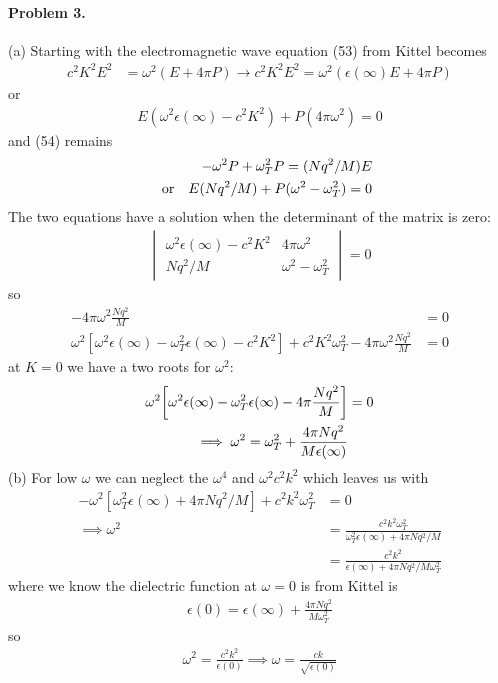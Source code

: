\documentclass[../main.tex]{subfiles}
\begin{document}
\paragraph*{Problem 3.} (a) Starting with the electromagnetic wave equation (53) from Kittel becomes
\begin{align*}
    c^2 K^2 E^2 &= \omega^2 (E + 4\pi P) \to c^2 K^2 E^2 = \omega^2(\epsilon(\infty)E + 4\pi P)
\end{align*}
or
\begin{align*}
    E(\omega^2 \epsilon(\infty) - c^2 K^2) + P(4\pi \omega^2) = 0
\end{align*}
and (54) remains 
\begin{align*}
    - \omega^2 P + \omega_T^2 P = (Nq^2/M) E \\
    \qor 
    E(Nq^2/M) + P(\omega^2 - \omega_T^2) = 0
\end{align*}
The two equations have a solution when the determinant of the matrix is zero:
\begin{align*}
    \begin{vmatrix}
        \omega^2 \epsilon(\infty) - c^2 K^2 & 4\pi\omega^2 \\
        Nq^2/M & \omega^2 - \omega_T^2
    \end{vmatrix} = 0
\end{align*}
so 
\begin{align*}
    [\omega^2 \epsilon(\infty) - c^2 K^2] [\omega^2 - \omega_T^2]  - 4\pi \omega^2 \frac{Nq^2}{M} &= 0 \\
    \omega^2[ \omega^2 \epsilon(\infty)  - \omega_T^2 \epsilon(\infty) - c^2 K^2 ] + c^2 K^2 \omega_T^2 - 4\pi \omega^2 \frac{Nq^2}{M} &= 0
\end{align*}
at $K = 0$ we have a two roots for $\omega^2$:
\begin{align*}
    \omega^2 \qt[ \omega^2 \epsilon(\infty) - \omega_T^2 \epsilon(\infty) - 4\pi  \frac{Nq^2}{M}] &= 0 \\
    \implies \omega^2 = \omega_T^2 + \frac{4\pi Nq^2}{M \epsilon(\infty)}
\end{align*}
(b) For low $\omega$ we can neglect the $\omega^4$ and $\omega^2c^2 k^2$ which leaves us with
\begin{align*}
    -\omega^2[\omega_T^2 \epsilon(\infty) + 4\pi Nq^2/M] + c^2 k^2 \omega_T^2 &= 0 \\
    \implies \omega^2 &= \frac{c^2 k^2 \omega_T^2}{\omega_T^2 \epsilon(\infty) + 4\pi Nq^2/M} \\
    &= \frac{c^2 k^2}{\epsilon(\infty) + 4\pi Nq^2/M\omega_T^2}
\end{align*}
where we know the dielectric function at $\omega = 0$ is from Kittel is
\begin{align*} \tag{59}
    \epsilon(0) = \epsilon(\infty) + \frac{4\pi Nq^2}{M \omega_T^2}
\end{align*}
so
\begin{align*}
    \omega^2 = \frac{c^2 k^2}{\epsilon(0)} \implies \omega =  \frac{c k}{\sqrt{\epsilon(0)}}
\end{align*}
\end{document}
